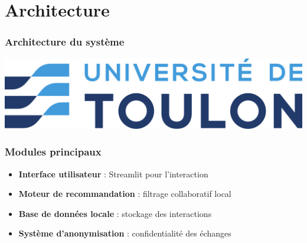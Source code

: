 \documentclass{beamer}
\begin{document}
\section{Architecture}
\begin{frame}
    \frametitle{Architecture du système}
    \begin{center}
        \includegraphics[width=0.8\linewidth]{logo}
    \end{center}
\end{frame}

\begin{frame}
    \frametitle{Modules principaux}
    \begin{itemize}
        \item \textbf{Interface utilisateur} : Streamlit pour l’interaction
        \item \textbf{Moteur de recommandation} : filtrage collaboratif local
        \item \textbf{Base de données locale} : stockage des interactions
        \item \textbf{Système d’anonymisation} : confidentialité des échanges
    \end{itemize}
\end{frame}
\end{document}
